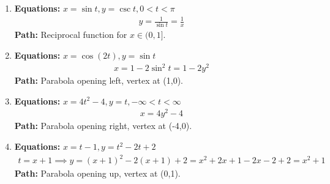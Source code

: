 \documentclass[12pt]{article}
\begin{document}
\begin{enumerate}
    \item \textbf{Equations:} $x=\sin t, y=\csc t, 0 < t < \pi$
    \begin{align*}
        y = \frac{1}{\sin t} = \frac{1}{x}
    \end{align*}
    \textbf{Path:} Reciprocal function for $x \in (0,1]$.
    
    \item \textbf{Equations:} $x=\cos(2t), y=\sin t$
    \begin{align*}
        x = 1-2\sin^2 t = 1-2y^2
    \end{align*}
    \textbf{Path:} Parabola opening left, vertex at (1,0).
    
    \item \textbf{Equations:} $x=4t^2-4, y=t, -\infty < t < \infty$
    \begin{align*}
        x = 4y^2 - 4
    \end{align*}
    \textbf{Path:} Parabola opening right, vertex at (-4,0).
    
    \item \textbf{Equations:} $x=t-1, y=t^2-2t+2$
    \begin{align*}
        t=x+1 \implies y = (x+1)^2 - 2(x+1) + 2 = x^2+2x+1-2x-2+2 = x^2+1
    \end{align*}
    \textbf{Path:} Parabola opening up, vertex at (0,1).
\end{enumerate}
\end{document}
